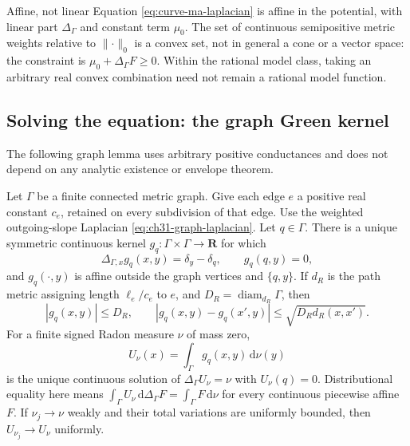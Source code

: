 \begin{warning}{Affine, not linear}
Equation \eqref{eq:curve-ma-laplacian} is affine in the potential,
with linear part \(\Delta_\Gamma\) and constant term \(\mu_0\).
The set of continuous semipositive metric weights relative to
\(\lVert\cdot\rVert_0\) is a convex set, not in general a cone or a
vector space: the constraint is
\(\mu_0+\Delta_\Gamma F\geq0\).
Within the rational model class, taking an arbitrary real convex
combination need not remain a rational model function.
\end{warning}

\subsection{Solving the equation: the graph Green kernel}
\label{sec:ch31-curve-green}

The following graph lemma uses arbitrary positive conductances and
does not depend on any analytic existence or envelope theorem.

\begin{lemma}
\label{lem:ch31-green-kernel}
Let \(\Gamma\) be a finite connected metric graph.  Give each edge \(e\)
a positive real constant \(c_e\), retained on every subdivision of that
edge.  Use the weighted outgoing-slope Laplacian
\eqref{eq:ch31-graph-laplacian}.
Let \(q\in \Gamma\).  There is a unique symmetric continuous kernel
\(g_q:\Gamma\times \Gamma\to\mathbf R\) for which
\begin{equation}
\label{eq:ch31-green-kernel}
 \Delta_{\Gamma,x}g_q(x,y)=\delta_y-\delta_q,
 \qquad g_q(q,y)=0,
\end{equation}
and \(g_q(\cdot,y)\) is affine outside the graph vertices and
\(\{q,y\}\).  If \(d_R\) is the path metric assigning length
\(\ell_e/c_e\) to \(e\), and \(D_R=\operatorname{diam}_{d_R}\Gamma\), then
\begin{equation}
\label{eq:ch31-green-kernel-estimates}
 |g_q(x,y)|\leq D_R,
 \qquad
 |g_q(x,y)-g_q(x',y)|\leq\sqrt{D_Rd_R(x,x')}.
\end{equation}
For a finite signed Radon measure \(\nu\) of mass zero,
\begin{equation}
\label{eq:ch31-green-potential}
 U_\nu(x)=\int_\Gamma g_q(x,y)\,\mathrm d\nu(y)
\end{equation}
is the unique continuous solution of \(\Delta_\Gamma U_\nu=\nu\) with
\(U_\nu(q)=0\).  Distributional equality here means
\(\int_\Gamma U_\nu\,\mathrm d\Delta_\Gamma F=\int_\Gamma F\,\mathrm d\nu\)
for every continuous piecewise affine \(F\).
If \(\nu_j\to\nu\) weakly and their total variations are uniformly
bounded, then \(U_{\nu_j}\to U_\nu\) uniformly.
\end{lemma}


